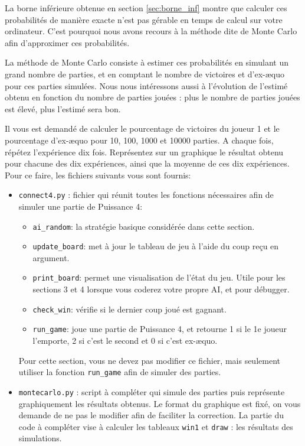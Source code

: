 \documentclass[11pt,answers]{exam}
\begin{document}
La borne inférieure obtenue en section \ref{sec:borne_inf} montre que calculer ces probabilités de manière exacte n'est pas gérable en temps de calcul sur votre ordinateur. C'est pourquoi nous avons recours à la méthode dite de Monte Carlo afin d'approximer ces probabilités.

La méthode de Monte Carlo consiste à estimer ces probabilités en simulant un grand nombre de parties, et en comptant le nombre de victoires et d'ex-æquo pour ces parties simulées. Nous nous intéressons aussi à l'évolution de l'estimé obtenu en fonction du nombre de parties jouées : plus le nombre de parties jouées est élevé, plus l'estimé sera bon.

Il vous est demandé de calculer le pourcentage de victoires du joueur 1 et le pourcentage d'ex-æquo pour 10, 100, 1000 et 10000 parties. A chaque fois, répétez l'expérience dix fois. Représentez sur un graphique le résultat obtenu pour chacune des dix expériences, ainsi que la moyenne de ces dix expériences. Pour ce faire, les fichiers suivants vous sont fournis:

\begin{itemize}
    \item \texttt{connect4.py} : fichier qui réunit toutes les fonctions nécessaires afin de simuler une partie de Puissance 4:
    \begin{itemize}
        \item \texttt{ai\_random}: la stratégie basique considérée dans cette section.
        \item \texttt{update\_board}: met à jour le tableau de jeu à l'aide du coup reçu en argument.
        \item \texttt{print\_board}: permet une visualisation de l'état du jeu. Utile pour les sections 3 et 4 lorsque vous coderez votre propre AI, et pour débugger.
        \item \texttt{check\_win}: vérifie si le dernier coup joué est gagnant.
        \item \texttt{run\_game}: joue une partie de Puissance 4, et retourne 1 si le 1e joueur l'emporte, 2 si c'est le second et 0 si c'est ex-æquo.
    \end{itemize}
    Pour cette section, vous ne devez pas modifier ce fichier, mais seulement utiliser la fonction \texttt{run\_game} afin de simuler des parties.
    \item \texttt{montecarlo.py} : script à compléter qui simule des parties puis représente graphiquement les résultats obtenus. Le format du graphique est fixé, on vous demande de ne pas le modifier afin de faciliter la correction. La partie du code à compléter vise à calculer les tableaux \texttt{win1} et \texttt{draw} : les résultats des simulations.
\end{itemize}
\end{document}
